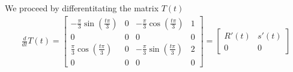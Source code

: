 \documentclass{article}
\begin{document}
\begin{enumerate}
\begin{enumerate}
      We proceed by differentitating the matrix $T(t)$
      \begin{align*}
       \frac{d}{dt} T(t) = \begin{bmatrix}
                            -\frac{\pi}{3} \sin\left( \frac{t \pi}{3} \right) & 0 & -\frac{\pi}{3} \cos\left( \frac{t \pi}{3}  \right) & 1
                            \\
                            0 & 0 & 0 & 0 \\
                            \frac{\pi}{3} \cos\left( \frac{t \pi}{3}  \right) & 0 & -\frac{\pi}{3} \sin\left( \frac{t \pi}{3}  \right) & 2 \\
                            0 & 0 & 0 & 0
                           \end{bmatrix} = \begin{bmatrix}
                           R'(t) & s'(t) \\
                           0 & 0 \end{bmatrix}
      \end{align*}
      

\end{enumerate}
\end{enumerate}
\end{document}
